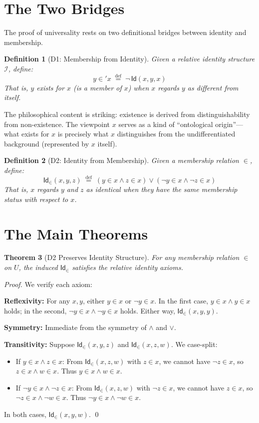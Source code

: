 \documentclass{ws-rv9x6}
\newtheorem{theorem}{Theorem}[section]
\newtheorem{definition}[theorem]{Definition}
\theoremstyle{remark}
\newcommand{\Id}{\mathsf{Id}}
\newcommand{\RI}{\mathcal{I}}
\begin{document}
\section{The Two Bridges}

The proof of universality rests on two definitional bridges between identity and membership.

\begin{definition}[D1: Membership from Identity]
Given a relative identity structure $\RI$, define:
\[
y \in' x \;\stackrel{\text{def}}{=}\; \neg\, \Id(x, y, x)
\]
That is, $y$ exists for $x$ (is a member of $x$) when $x$ regards $y$ as \emph{different from itself}.
\end{definition}

The philosophical content is striking: existence is derived from distinguishability from non-existence. The viewpoint $x$ serves as a kind of ``ontological origin''---what exists for $x$ is precisely what $x$ distinguishes from the undifferentiated background (represented by $x$ itself).

\begin{definition}[D2: Identity from Membership]
Given a membership relation $\in$, define:
\[
\Id_\in(x, y, z) \;\stackrel{\text{def}}{=}\; (y \in x \land z \in x) \lor (\neg y \in x \land \neg z \in x)
\]
That is, $x$ regards $y$ and $z$ as identical when they have the same membership status with respect to $x$.
\end{definition}

\section{The Main Theorems}

\begin{theorem}[D2 Preserves Identity Structure]
\label{thm:d2-preserves}
For any membership relation $\in$ on $U$, the induced $\Id_\in$ satisfies the relative identity axioms.
\end{theorem}

\begin{proof}
We verify each axiom:

\textbf{Reflexivity:} For any $x, y$, either $y \in x$ or $\neg y \in x$. In the first case, $y \in x \land y \in x$ holds; in the second, $\neg y \in x \land \neg y \in x$ holds. Either way, $\Id_\in(x, y, y)$.

\textbf{Symmetry:} Immediate from the symmetry of $\land$ and $\lor$.

\textbf{Transitivity:} Suppose $\Id_\in(x, y, z)$ and $\Id_\in(x, z, w)$. We case-split:
\begin{itemize}
    \item If $y \in x \land z \in x$: From $\Id_\in(x, z, w)$ with $z \in x$, we cannot have $\neg z \in x$, so $z \in x \land w \in x$. Thus $y \in x \land w \in x$.
    \item If $\neg y \in x \land \neg z \in x$: From $\Id_\in(x, z, w)$ with $\neg z \in x$, we cannot have $z \in x$, so $\neg z \in x \land \neg w \in x$. Thus $\neg y \in x \land \neg w \in x$.
\end{itemize}
In both cases, $\Id_\in(x, y, w)$.
\qed
\end{proof}
\end{document}
